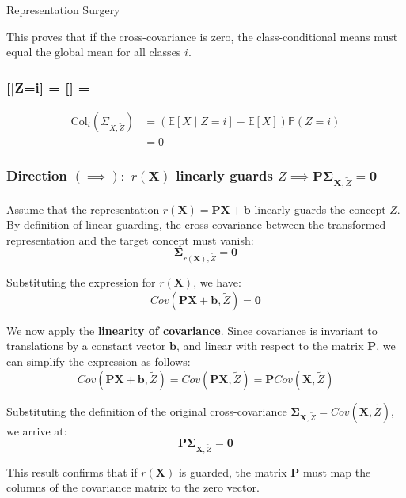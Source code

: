 \begin{question}{Representation Surgery}
\begin{subquestion}
This proves that if the cross-covariance is zero, the class-conditional means must equal the global mean for all classes $i$.

\subsubsection*{[\X|Z=i] = [\X] \implies \SigXZ = }

\begin{align*}
\text{Col}_i(\Sigma_{X, \tilde{Z}}) &= (\mathbb{E}[X \mid Z=i] - \mathbb{E}[X]) \mathbb{P}(Z=i) \\
&= 0
\end{align*}

\end{subquestion}

\begin{subquestion}

\subsubsection*{Direction $(\implies):$ $r(\mathbf{X})$ linearly guards $Z \implies \mathbf{P} \boldsymbol{\Sigma}_{\mathbf{X}, \tilde{Z}} = \mathbf{0}$}

Assume that the representation $r(\mathbf{X}) = \mathbf{P}\mathbf{X} + \mathbf{b}$ linearly guards the concept $Z$. By definition of linear guarding, the cross-covariance between the transformed representation and the target concept must vanish:
$$\boldsymbol{\Sigma}_{r(\mathbf{X}), \tilde{Z}} = \mathbf{0}$$

Substituting the expression for $r(\mathbf{X})$, we have:
$$Cov(\mathbf{P}\mathbf{X} + \mathbf{b}, \tilde{Z}) = \mathbf{0}$$

We now apply the \textbf{linearity of covariance}. Since covariance is invariant to translations by a constant vector $\mathbf{b}$, and linear with respect to the matrix $\mathbf{P}$, we can simplify the expression as follows:
$$Cov(\mathbf{P}\mathbf{X} + \mathbf{b}, \tilde{Z}) = Cov(\mathbf{P}\mathbf{X}, \tilde{Z}) = \mathbf{P} Cov(\mathbf{X}, \tilde{Z})$$

Substituting the definition of the original cross-covariance $\boldsymbol{\Sigma}_{\mathbf{X}, \tilde{Z}} = Cov(\mathbf{X}, \tilde{Z})$, we arrive at:
$$\mathbf{P} \boldsymbol{\Sigma}_{\mathbf{X}, \tilde{Z}} = \mathbf{0}$$

This result confirms that if $r(\mathbf{X})$ is guarded, the matrix $\mathbf{P}$ must map the columns of the covariance matrix to the zero vector.


\end{subquestion}
\end{question}
